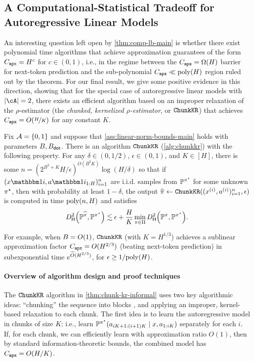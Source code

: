 \subsection{A Computational-Statistical Tradeoff for Autoregressive Linear Models}\label{sec:comp-ub}

An interesting question left open by \cref{thm:comp-lb-main} is whether there exist polynomial time algorithms that achieve approximation guarantees of the form $C_{\texttt{apx}}=H^{c}$ for $c\in(0,1)$, i.e., in the regime between the $C_{\texttt{apx}}=\Omega(H)$ barrier for next-token prediction and the sub-polynomial $C_{\texttt{apx}}\ll\mathrm{poly}(H)$ region ruled out by the theorem. For our final result, we give some positive evidence in this direction, showing that for the special case of autoregressive linear models with $\abs{\cA}=2$, there exists an efficient algorithm based on an improper relaxation of the $\rho$-estimator (the \emph{chunked, kernelized $\rho$-estimator}, or $\texttt{ChunkKR}$) that achieves $C_{\texttt{apx}}=O(\nicefrac{H}{K})$ for any constant $K$.\loose

\begin{theorem}\label{thm:chunk-kr-informal}
Fix $\mathcal{A} = \{0,1\}$ and suppose that \cref{ass:linear-norm-bounds-main} holds with parameters $B,B_{\mathsf{dot}}$. There is an algorithm $\texttt{ChunkKR}$ (\cref{alg:chunkkr}) with the following property. For any $\delta \in (0,1/2)$, $\epsilon \in (0,1)$, and $K \in [H]$, there is some $n = (2^{B^2+K}H/\epsilon)^{O(B^2 K)} \log(H/\delta)$ so that if $(x\ind{i},a\ind{i}_{1:H})_{i=1}^n$ are i.i.d. samples from $\mathbb{P}^{\pi^{\star}}$ for some unknown $\pi^{\star}$, then with probability at least $1-\delta$, the output $\widehat{\pi}\gets \texttt{ChunkKR}((x^{(i)},a^{(i)})_{i=1}^n, \epsilon)$ is computed in time $\mathrm{poly}(n,H)$ and satisfies
\[\Dhels{\BP^{\pihat}}{\BP^{\pistar}}
\lesssim \epsilon + \frac{H}{K} \min_{\pi\in\Pi} \Dhels{\BP^{\pi}}{\BP^{\pistar}}.\]
\end{theorem}
For example, when $B=O(1)$, $\texttt{ChunkKR}$ (with $K=H^{1/3}$) achieves a sublinear approximation factor $C_{\texttt{apx}}=O(H^{2/3})$ (beating next-token prediction) in subexponential time $e^{\widetilde{O}(H^{2/3})}$, for $\epsilon\geq1/\mathrm{poly}(H)$.
\loose
{}

\paragraph{Overview of algorithm design and proof techniques}
The $\texttt{ChunkKR}$ algorithm in \cref{thm:chunk-kr-informal} uses two key algorithmic ideas: ``chunking'' the sequence into blocks \citep{chi2023diffusion,zhao2023learning,block2024provable}, and applying an improper, kernel-based relaxation to each chunk. The first idea is to learn the autoregressive model in chunks of size $K$: i.e., learn $\mathbb{P}^{\pi^{\star}}(a_{iK+1:(i+1)K}\mid{}x,a_{1:iK})$ separately for each $i$. If, for each chunk, we can efficiently learn with approximation ratio $O(1)$, then by standard information-theoretic bounds, the combined model has $C_{\texttt{apx}} = O(H/K)$.\loose

